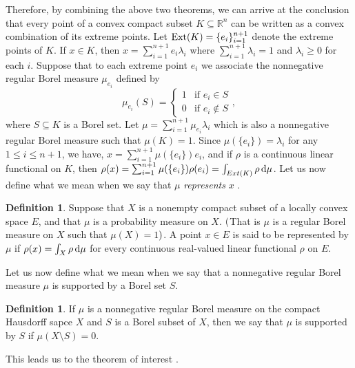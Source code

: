 \documentclass[12pt,a4paper]{amsart}
\theoremstyle{definition}
\newtheorem{definition}[theorem]{Definition}
\begin{document}
	Therefore, by combining the above two theorems, we can arrive at the conclusion that every point of a convex compact subset  $K \subseteq \mathbb{R}^{n}$ can be written as a convex combination of its extreme points. Let $\textnormal{Ext}(K) = \lbrace e_i \rbrace_{i=1}^{n+1}$ denote the extreme points of $K$. If $x \in K $, then $ x = \sum_{i=1}^{n+1} e_i \lambda_i $ where $\sum_{i=1}^{n+1} \lambda_i = 1$ and $\lambda_{i} \geq 0$ for each $i$. Suppose  that to each extreme point $e_{i}$ we associate the nonnegative regular Borel measure $\mu_{e_i}$ defined by
	\[
	\mu_{e_i}(S) = 
	\begin{cases} 
		1 & \text{if } e_i \in S \\
		0 & \text{if } e_i \notin S
	\end{cases},
	\]
	where $S \subseteq K$ is a Borel set. Let $\mu = \sum_{i=1}^{n+1} \mu_{e_i} \lambda_{i} $ which is also a nonnegative regular Borel measure such that $\mu(K) = 1$. Since $\mu(\lbrace e_i \rbrace) = \lambda_i$ for any $1 \leq i \leq n+1$, we have, $ x= \sum_{i=1}^{n+1} \mu(\lbrace e_i \rbrace) e_i$, and if $\rho$ is a continuous linear functional on $K$, then $\rho(x) = \sum_{i=1}^{n+1} \mu(\lbrace e_i \rbrace) \rho(e_i) = \int_{Ext(K)}  \rho\,  \rm{d} \mu $. Let us now define what we mean when we say that $\mu$ \emph{represents} $x$ \cite[Pg 1 Definition]{phelps}.
	
	\begin{definition}
		Suppose that $X$ is a nonempty compact subset of a locally convex space $E$, and that $\mu$ is a probability measure on $X$. $\textnormal{(}$That is $\mu$ is a regular Borel measure on $X$ such that $\mu(X) = 1$$\textnormal{)}$. A point $x \in E$ is said to be represented by $\mu$ if $\rho(x) = \int_{X} \rho  \,  {\rm d} \mu$ for every continuous real-valued linear functional $\rho$ on $E$.
	\end{definition}
	
	Let us now define what we mean when we say that a nonnegative regular Borel measure $\mu$ is supported by a Borel set $S$.
	
	\begin{definition}
		If $\mu$ is a nonnegative regular Borel measure on the compact Hausdorff sapce $X$ and $S$ is a Borel subset of $X$, then we say that $\mu$ is supported by $S$ if $\mu(X \setminus S) = 0$.
	\end{definition}
	
	This leads us to the theorem of interest \cite[Page 14, Theorem (Choquet)]{phelps}.
	
\end{document}
